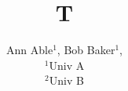 \documentclass{mnras}
\begin{document}
\title{T}
\author[A. Able et al.]{Ann Able$^{1}$, Bob Baker$^{1}$,
\\ $^{1}$Univ A\\ $^{2}$Univ B}
\maketitle
\end{document}
